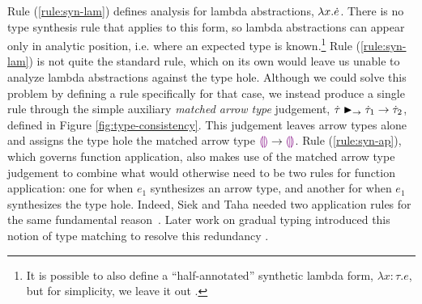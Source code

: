 Rule (\ref{rule:syn-lam}) defines analysis for lambda abstractions,
$\lambda x.\dot{e}$. There is no type synthesis rule that applies  
to this form, so lambda abstractions can appear only in analytic position,
i.e. where an expected type is known.\footnote{It is possible to also define a
  ``half-annotated'' synthetic lambda form, $\lambda x{:}\tau.e$, but for
  simplicity, we leave it out \citep{DBLP:conf/tldi/ChlipalaPH05}.}  Rule
(\ref{rule:syn-lam}) is not quite the standard rule,
%
which on its own would leave us unable to analyze
lambda abstractions against the type hole.
Although we could solve this problem by defining a rule 
specifically for that case, we 
instead produce a single rule through the
simple auxiliary \emph{matched arrow type} judgement,
$\dot{\tau} \blacktriangleright_{\rightarrow} \dot{\tau}_1 \rightarrow \dot{\tau}_2$, defined in Figure
\ref{fig:type-consistency}. This judgement leaves arrow types alone and
assigns the type hole the matched arrow type $\textcolor{violet}{\llparenthesis}\textcolor{violet}{\rrparenthesis} \rightarrow \textcolor{violet}{\llparenthesis}\textcolor{violet}{\rrparenthesis}$.  
Rule (\ref{rule:syn-ap}), which governs function
application, also makes use of the matched arrow type judgement to
combine what would otherwise need to be two rules for function application:
one for when $e_1$ synthesizes an arrow type, and another for when $e_1$
synthesizes the type hole. Indeed, Siek and Taha needed two application
rules for the same fundamental reason~\citep{Siek06a}. Later work on gradual
typing introduced this notion of type matching to resolve this redundancy \citep{DBLP:conf/popl/CiminiS16,DBLP:conf/popl/GarciaC15,DBLP:conf/popl/RastogiCH12}.


